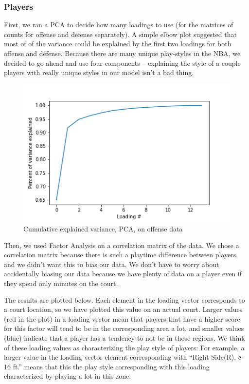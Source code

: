 \documentclass[]{article}
\begin{document}
\subsubsection{Players}\label{players}

First, we ran a PCA to decide how many loadings to use (for the matrices
of counts for offense and defense separately). A simple elbow plot
suggested that most of of the variance could be explained by the first
two loadings for both offense and defense. Because there are many unique
play-styles in the NBA, we decided to go ahead and use four components
-- explaining the style of a couple players with really unique styles in
our model isn't a bad thing.

\begin{figure}
\centering
\includegraphics{cum_pca_offense.png}
\caption{Cumulative explained variance, PCA, on offense data}
\end{figure}

Then, we used Factor Analysis on a correlation matrix of the data. We
chose a correlation matrix because there is such a playtime difference
between players, and we didn't want this to bias our data. We don't have
to worry about accidentally biasing our data because we have plenty of
data on a player even if they spend only minutes on the court.

The results are plotted below. Each element in the loading vector
corresponds to a court location, so we have plotted this value on an
actual court. Larger values (red in the plot) in a loading vector mean
that players that have a higher score for this factor will tend to be in
the corresponding area a lot, and smaller values (blue) indicate that a
player has a tendency to not be in those regions. We think of these
loading values as characterizing the play style of players: For example,
a larger value in the loading vector element corresponding with ``Right
Side(R), 8-16 ft.'' means that this the play style corresponding with
this loading characterized by playing a lot in this zone.
\end{document}
